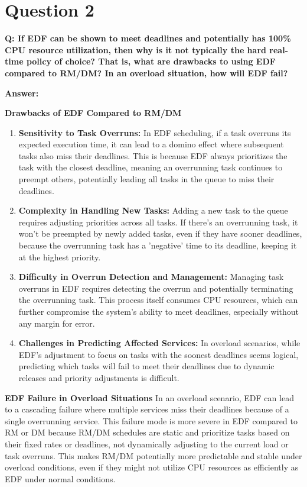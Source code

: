 \documentclass[a4paper,11pt]{article}%
\newenvironment{qanda}{\setlength{\parindent}{0pt}}{\bigskip}
\newcommand{\Q}{\bigskip\bfseries Q: }
\newcommand{\A}{\par\textbf{Answer: } \normalfont}
\begin{document}
\begin{qanda}
	\section{Question 2}
	\Q   If EDF can be shown to meet deadlines and potentially has 100\% CPU resource utilization, then why is it not typically the hard real-time policy of choice? That is, what are drawbacks to using EDF compared to	RM/DM? In an overload situation, how will EDF fail?
	\A

	\textbf{Drawbacks of EDF Compared to RM/DM}
	\begin{enumerate}
		\item \textbf{Sensitivity to Task Overruns:} In EDF scheduling, if a task overruns its expected execution time, it can lead to a domino effect where subsequent tasks also miss their deadlines. This is because EDF always prioritizes the task with the closest deadline, meaning an overrunning task continues to preempt others, potentially leading all tasks in the queue to miss their deadlines.
		\item \textbf{Complexity in Handling New Tasks:} Adding a new task to the queue requires adjusting priorities across all tasks. If there's an overrunning task, it won't be preempted by newly added tasks, even if they have sooner deadlines, because the overrunning task has a 'negative' time to its deadline, keeping it at the highest priority.
		\item \textbf{Difficulty in Overrun Detection and Management:} Managing task overruns in EDF requires detecting the overrun and potentially terminating the overrunning task. This process itself consumes CPU resources, which can further compromise the system's ability to meet deadlines, especially without any margin for error.
		\item \textbf{Challenges in Predicting Affected Services:} In overload scenarios, while EDF's adjustment to focus on tasks with the soonest deadlines seems logical, predicting which tasks will fail to meet their deadlines due to dynamic releases and priority adjustments is difficult.
	\end{enumerate}







	\textbf{EDF Failure in Overload Situations}
	In an overload scenario, EDF can lead to a cascading failure where multiple services miss their deadlines because of a single overrunning service. This failure mode is more severe in EDF compared to RM or DM because RM/DM schedules are static and prioritize tasks based on their fixed rates or deadlines, not dynamically adjusting to the current load or task overruns. This makes RM/DM potentially more predictable and stable under overload conditions, even if they might not utilize CPU resources as efficiently as EDF under normal conditions.\\


\end{qanda}
\end{document}
